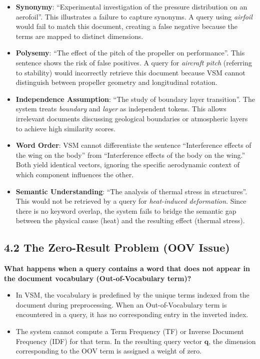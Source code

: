 \begin{itemize}
    \item \textbf{Synonymy}: ``Experimental investigation of the pressure distribution on an aerofoil''.
    This illustrates a failure to capture synonyms. A query using \textit{airfoil} would fail to match this document, creating a false negative because the terms are mapped to distinct dimensions.

    \item \textbf{Polysemy}: ``The effect of the pitch of the propeller on performance''.
    This sentence shows the risk of false positives. A query for \textit{aircraft pitch} (referring to stability) would incorrectly retrieve this document because VSM cannot distinguish between propeller geometry and longitudinal rotation.

    \item \textbf{Independence Assumption}: ``The study of boundary layer transition''.
    The system treats \textit{boundary} and \textit{layer} as independent tokens. This allows irrelevant documents discussing geological boundaries or atmospheric layers to achieve high similarity scores.

    \item \textbf{Word Order}: VSM cannot differentiate the sentence ``Interference effects of the wing on the body'' from ``Interference effects of the body on the wing.'' Both yield identical vectors, ignoring the specific aerodynamic context of which component influences the other.

    \item \textbf{Semantic Understanding}: ``The analysis of thermal stress in structures''.
    This would not be retrieved by a query for \textit{heat-induced deformation}. Since there is no keyword overlap, the system fails to bridge the semantic gap between the physical cause (heat) and the resulting effect (thermal stress).
\end{itemize}

\subsection*{4.2 The Zero-Result Problem (OOV Issue)}
\textbf{What happens when a query contains a word that does not appear in the document vocabulary (Out-of-Vocabulary term)?}
\begin{itemize}
    \item In VSM, the vocabulary is predefined by the unique terms indexed from the document during preprocessing. When an Out-of-Vocabulary term is encountered in a query, it has no corresponding entry in the inverted index.
    \item The system cannot compute a Term Frequency (TF) or Inverse Document Frequency (IDF) for that term. In the resulting query vector $\mathbf{q}$, the dimension corresponding to the OOV term is assigned a weight of zero.
\end{itemize}

